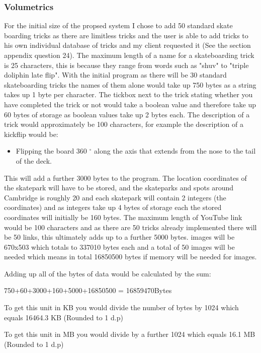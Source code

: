 \subsubsection{Volumetrics}

For the initial size of the propsed system I chose to add 50 standard skate boarding tricks as there are limitless tricks and the user is able to add tricks to his own individual database of tricks and my client requested it (See the section appendix question 24). The maximum length of a name for a skateboarding trick is 25 characters, this is because they range from words such as "shuv" to "triple doliphin late flip". With the initial program as there will be 30 standard skateboarding tricks the names of them alone would take up 750 bytes as a string takes up 1 byte per character. The tickbox next to the trick stating whether you have completed the trick or not would take a boolean value and therefore take up 60 bytes of storage as boolean values take up 2 bytes each. The description of a trick would approximately be 100 characters, for example the description of a kickflip would be:

\begin{itemize}
\item  Flipping the board 360 $^{\circ}$  along the axis that extends from the nose to the tail of the deck.
\end{itemize}

This will add a further 3000 bytes to the program. The location coordinates of the skatepark will have to be stored, and the skateparks and spots around Cambridge is roughly 20 and each skatepark will contain 2 integers (the coordinates) and as integers take up 4 bytes of storage each the stored coordinates will initially be 160 bytes. The maximum length of YouTube link would be 100 characters and as there are 50 tricks already implemented there will be 50 links, this ultimately adds up to a further 5000 bytes.
images will be 670x503 which totals to 337010 bytes each and a total of 50 images will be needed which means in total 16850500 bytes if memory will be needed for images. 


Adding up all of the bytes of data would be calculated by the sum:

750+60+3000+160+5000+16850500 = 16859470Bytes 

To get this unit in KB you would divide the number of bytes by 1024 which equals 16464.3 KB (Rounded to 1 d.p)

To get this unit in MB you would divide by a further 1024 which equals 16.1 MB (Rounded to 1 d.p)

